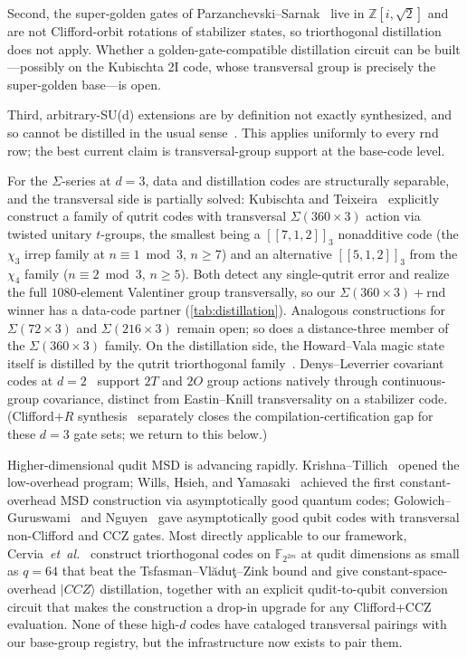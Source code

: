 \documentclass[twocolumn,superscriptaddress,showpacs,nofootinbib,notitlepage,preprintnumbers,secnumarabic,amssymb, nobibnotes, aps, prd]{revtex4-2}
\newcommand{\Sigmathree}[1]{\Sigma(#1\!\times\!3)} %
\begin{document}
Second, the super-golden gates of Parzanchevski--Sarnak~\cite{ParzanchevskiSarnak:2018} live in $\mathbb{Z}[i,\sqrt{2}]$ and are not Clifford-orbit rotations of stabilizer states, so triorthogonal distillation does not apply. Whether a golden-gate-compatible distillation circuit can be built---possibly on the Kubischta 2I code, whose transversal group is precisely the super-golden base---is open.

Third, arbitrary-SU(d) extensions are by definition not exactly synthesized, and so cannot be distilled in the usual sense~\cite{Bravyi:2004isx,Bravyi:2012czv}. This applies uniformly to every rnd row; the best current claim is transversal-group support at the base-code level.

For the $\Sigma$-series at $d=3$, data and distillation codes are structurally separable, and the transversal side is partially solved: Kubischta and Teixeira~\cite{KubischtaTeixeira:2024} explicitly construct a family of qutrit codes with transversal $\Sigmathree{360}$ action via twisted unitary $t$-groups, the smallest being a $[[7,1,2]]_3$ nonadditive code (the $\chi_3$ irrep family at $n\equiv 1\bmod 3$, $n\geq 7$) and an alternative $[[5,1,2]]_3$ from the $\chi_4$ family ($n\equiv 2\bmod 3$, $n\geq 5$). Both detect any single-qutrit error and realize the full $1080$-element Valentiner group transversally, so our $\Sigmathree{360}+\mathrm{rnd}$ winner has a data-code partner (\cref{tab:distillation}). Analogous constructions for $\Sigmathree{72}$ and $\Sigmathree{216}$ remain open; so does a distance-three member of the $\Sigmathree{360}$ family. On the distillation side, the Howard--Vala magic state itself is distilled by the qutrit triorthogonal family~\cite{Campbell:2012jna,PrakashSaha:2025}. Denys--Leverrier covariant codes at $d=2$~\cite{DenysLeverrier:2024,DenysLeverrier:2023} support $2T$ and $2O$ group actions natively through continuous-group covariance, distinct from Eastin--Knill transversality on a stabilizer code. (Clifford$+R$ synthesis~\cite{Gustafson:2025qutrit} separately closes the compilation-certification gap for these $d=3$ gate sets; we return to this below.)

Higher-dimensional qudit MSD is advancing rapidly. Krishna--Tillich~\cite{KrishnaTillich:2019} opened the low-overhead program; Wills, Hsieh, and Yamasaki~\cite{WillsHsiehYamasaki:2025} achieved the first constant-overhead MSD construction via asymptotically good quantum codes; Golowich--Guruswami~\cite{GolowichGuruswami:2024} and Nguyen~\cite{Nguyen:2025ccz} gave asymptotically good qubit codes with transversal non-Clifford and CCZ gates. Most directly applicable to our framework, Cervia~\emph{et~al.}~\cite{Cervia:2025agc} construct triorthogonal codes on $\mathbb{F}_{2^{2m}}$ at qudit dimensions as small as $q=64$ that beat the Tsfasman--Vlădu\c{t}--Zink bound and give constant-space-overhead $|CCZ\rangle$ distillation, together with an explicit qudit-to-qubit conversion circuit that makes the construction a drop-in upgrade for any Clifford+CCZ evaluation. None of these high-$d$ codes have cataloged transversal pairings with our base-group registry, but the infrastructure now exists to pair them.
\end{document}
